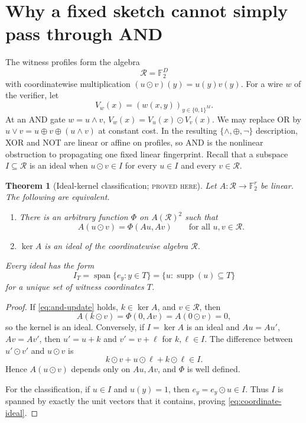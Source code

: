 \documentclass[11pt]{article}
\newtheorem{theorem}{Theorem}[section]
\theoremstyle{definition}
\theoremstyle{remark}
\newcommand{\bits}{\{0,1\}}
\newcommand{\F}{\mathbb F}
\newcommand{\Span}{\operatorname{span}}
\newcommand{\supp}{\operatorname{supp}}
\newcommand{\had}{\mathbin{\odot}}
\newcommand{\status}[1]{\textsc{#1}}
\begin{document}
\section{Why a fixed sketch cannot simply pass through AND}
\label{sec:and-barrier}

The witness profiles form the algebra
\[
  \mathcal R=\F_2^D
\]
with coordinatewise multiplication
$(u\had v)(y)=u(y)v(y)$.  For a wire $w$ of the verifier, let
\[
  V_w(x)=(w(x,y))_{y\in\bits^M}.
\]
At an AND gate $w=u\wedge v$,
$V_w(x)=V_u(x)\had V_v(x)$.  We may replace OR by
$u\vee v=u\oplus v\oplus(u\wedge v)$ at constant cost.  In the resulting
$\{\wedge,\oplus,\neg\}$ description, XOR and NOT are linear or affine on
profiles, so AND is the nonlinear obstruction to propagating one fixed linear
fingerprint.  Recall that a subspace $I\subseteq\mathcal R$ is an ideal when
$u\had v\in I$ for every $u\in I$ and every $v\in\mathcal R$.

\begin{theorem}[Ideal-kernel classification; \status{proved here}]
\label{thm:ideal-kernel}
Let $A:\mathcal R\to\F_2^r$ be linear.  The following are equivalent.
\begin{enumerate}[label=(\roman*)]
\item There is an arbitrary function $\Phi$ on $A(\mathcal R)^2$ such that
\[
  A(u\had v)=\Phi(Au,Av)
  \qquad\text{for all }u,v\in\mathcal R.
  \tag{5.1}\label{eq:and-update}
\]
\item $\ker A$ is an ideal of the coordinatewise algebra $\mathcal R$.
\end{enumerate}
Every ideal has the form
\[
  I_T=\Span\{e_y:y\in T\}
  =\{u:\supp(u)\subseteq T\}
  \tag{5.2}\label{eq:coordinate-ideal}
\]
for a unique set of witness coordinates $T$.
\end{theorem}

\begin{proof}
If \eqref{eq:and-update} holds, $k\in\ker A$, and $v\in\mathcal R$, then
\[
  A(k\had v)=\Phi(0,Av)=A(0\had v)=0,
\]
so the kernel is an ideal.  Conversely, if $I=\ker A$ is an ideal and
$Au=Au'$, $Av=Av'$, then $u'=u+k$ and $v'=v+\ell$ for $k,\ell\in I$.  The
difference between $u'\had v'$ and $u\had v$ is
\[
  k\had v+u\had\ell+k\had\ell\in I.
\]
Hence $A(u\had v)$ depends only on $Au,Av$, and $\Phi$ is well defined.

For the classification, if $u\in I$ and $u(y)=1$, then
$e_y=e_y\had u\in I$.  Thus $I$ is spanned by exactly the unit vectors that
it contains, proving \eqref{eq:coordinate-ideal}.
\end{proof}
\end{document}
